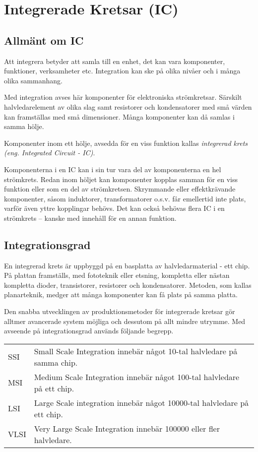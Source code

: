 \section{Integrerade Kretsar (IC)}

\subsection{Allmänt om IC}

Att integrera betyder att samla till en enhet, det kan vara komponenter,
funktioner, verksamheter etc. Integration kan ske på olika nivåer och i många
olika sammanhang.

Med integration avses här komponenter för elektroniska strömkretsar. Särskilt
halvledarelement av olika slag samt resistorer och kondensatorer med små värden
kan framställas med små dimensioner. Många komponenter kan då samlas i samma
hölje.

Komponenter inom ett hölje, avsedda för en viss funktion kallas
\emph{integrerad krets (eng. Integrated Circuit - IC)}.

Komponenterna i en IC kan i sin tur vara del av komponenterna en hel strömkrets.
Redan inom höljet kan komponenter kopplas samman för en viss funktion eller som
en del av strömkretsen. Skrymmande eller effektkrävande komponenter, såsom
induktorer, transformatorer o.s.v. får emellertid inte plats, varför även yttre
kopplingar behövs. Det kan också behövas flera IC i en strömkrets -- kanske med
innehåll för en annan funktion.

\subsection{Integrationsgrad}

En integrerad krets är uppbyggd på en basplatta av halvledarmaterial - ett chip.
På plattan framställs, med fototeknik eller etsning, kompletta eller nästan
kompletta dioder, transistorer, resistorer och kondensatorer. Metoden, som
kallas planarteknik, medger att många komponenter kan få plats på samma platta.

Den snabba utvecklingen av produktionsmetoder för integrerade kretsar gör
alltmer avancerade system möjliga och dessutom på allt mindre utrymme. Med
avseende på integrationsgrad används följande begrepp.

\begin{tabular}{lp{6cm}}
SSI & Small Scale Integration innebär något 10-tal halvledare på samma chip. \\
MSI & Medium Scale Integration innebär något 100-tal halvledare på ett chip. \\
LSI & Large Scale integration innebär något 10000-tal halvledare på ett chip. \\
VLSI & Very Large Scale Integration innebär 100000 eller fler halvledare. \\
\end{tabular}

